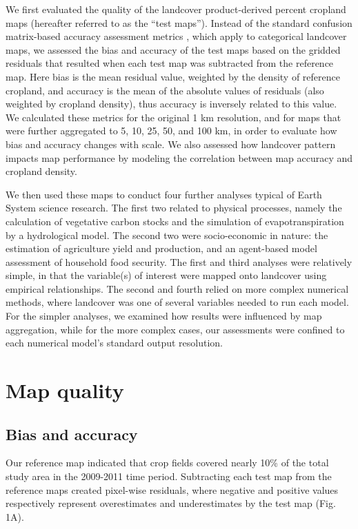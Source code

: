 \documentclass{pnastwo}
\begin{document}
\begin{article}
We first evaluated the quality of the landcover product-derived percent cropland maps (hereafter referred to as the ``test maps''). Instead of the standard confusion matrix-based accuracy assessment metrics \cite{olofsson_good_2014,olofsson_making_2013}, which apply to categorical landcover maps, we assessed the bias and accuracy of the test maps based on the gridded residuals that resulted when each test map was subtracted from the reference map. Here bias is the mean residual value, weighted by the density of reference cropland, and accuracy is the mean of the absolute values of residuals (also weighted by cropland density), thus accuracy is inversely related to this value. We calculated these metrics for the original 1 km resolution, and for maps that were further aggregated to 5, 10, 25, 50, and 100 km, in order to evaluate how bias and accuracy changes with scale. We also assessed how landcover pattern impacts map performance by modeling the correlation between map accuracy and cropland density.  

We then used these maps to conduct four further analyses typical of Earth System science research. The first two related to physical processes, namely the calculation of vegetative carbon stocks and the simulation of evapotranspiration by a hydrological model. The second two were socio-economic in nature: the estimation of agriculture yield and production, and an agent-based model assessment of household food security.  The first and third analyses were relatively simple, in that the variable(s) of interest were mapped onto landcover using empirical relationships. The second and fourth relied on more complex numerical methods, where landcover was one of several variables needed to run each model. For the simpler analyses, we examined how results were influenced by map aggregation, while for the more complex cases, our assessments were confined to each numerical model's standard output resolution. 

\vspace{-0.5 cm}
\section{Map quality}
\subsection{Bias and accuracy}

Our reference map indicated that crop fields covered nearly 10\% of the total study area in the 2009-2011 time period. Subtracting each test map from the reference maps created pixel-wise residuals, where negative and positive values respectively represent overestimates and underestimates by the test map (Fig. 1A).    


\end{article}
\end{document}

